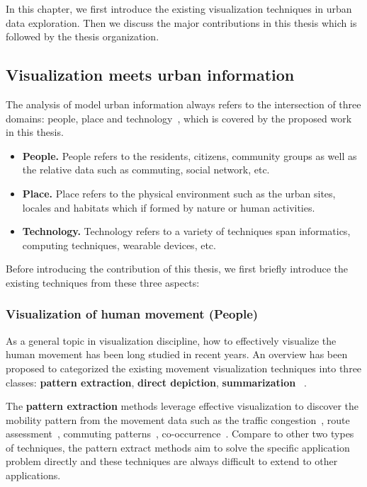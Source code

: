 In this chapter, we first introduce the existing visualization techniques in urban data exploration. Then we discuss the major contributions in this thesis which is followed by the thesis organization.

\subsection{Visualization meets urban information}

 
The analysis of model urban information always refers to the intersection of three domains: people, place and technology~\cite{foth2011urban}, which is covered by the proposed work in this thesis.
\begin{itemize}
\item \textbf{People.} People refers to the residents, citizens, community groups as well as the relative data such as commuting, social network, etc.
\item \textbf{Place.} Place refers to the physical environment such as the urban sites, locales and habitats which if formed by nature or human activities.
\item \textbf{Technology.} Technology refers to a variety of techniques span informatics, computing techniques, wearable devices, etc.
\end{itemize}

Before introducing the contribution of this thesis, we first briefly introduce the existing techniques from these three aspects:

\subsubsection{Visualization of human movement (People)}
As a general topic in visualization discipline, how to effectively visualize the human movement has been long studied in recent years.  An overview has been proposed to categorized the existing movement visualization techniques into three classes: \textbf{pattern extraction}, \textbf{direct depiction}, \textbf{summarization} ~\cite{andrienko2013visual, wu2015telcovis}.

The \textbf{pattern extraction} methods leverage effective visualization to discover the mobility pattern from the movement data such as the traffic congestion~\cite{wang2013visual}, route assessment~\cite{wang2014visual, huang2015trajgraph}, commuting patterns~\cite{beecham2014studying, von2015mobilitygraphs}, co-occurrence~\cite{wu2015telcovis, ni2017spatio}. Compare to other two types of techniques, the pattern extract methods aim to solve the specific application problem directly and these techniques are always difficult to extend to other applications.

